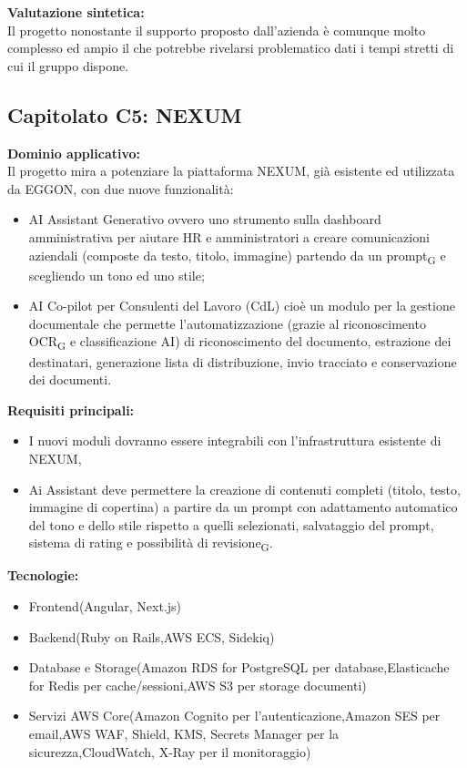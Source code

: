 \vspace{0.3cm}
\textbf{Valutazione sintetica:} \\
Il progetto nonostante il supporto proposto dall'azienda è comunque molto complesso ed ampio il che potrebbe rivelarsi problematico dati i 
tempi stretti di cui il gruppo dispone.

\vspace{0.5cm}

\vspace{0.5cm}

\subsection{Capitolato C5: {NEXUM} }

\textbf{Dominio applicativo:} \\
{Il progetto mira a potenziare la piattaforma NEXUM, già esistente ed utilizzata da EGGON, con due nuove funzionalità:}
\begin{itemize}
    \item AI Assistant Generativo ovvero uno strumento sulla dashboard amministrativa per aiutare HR e amministratori a creare comunicazioni aziendali (composte da testo, titolo, immagine) partendo da un prompt\textsubscript{G} e scegliendo un tono ed uno stile;
    \item AI Co-pilot per Consulenti del Lavoro (CdL) cioè un modulo per la gestione documentale che permette l’automatizzazione (grazie al riconoscimento OCR\textsubscript{G} e classificazione AI) di riconoscimento del documento, estrazione dei destinatari, generazione lista di distribuzione, invio tracciato e conservazione dei documenti.
\end{itemize}
\vspace{0.3cm}

\textbf{Requisiti principali:}
\begin{itemize}
	\item I nuovi moduli dovranno essere integrabili con l’infrastruttura esistente di NEXUM,
	\item Ai Assistant deve permettere la creazione di contenuti completi (titolo, testo, immagine di copertina) a partire da un prompt con adattamento automatico del tono e dello stile rispetto a quelli selezionati, salvataggio del prompt, sistema di rating e possibilità di revisione\textsubscript{G}.
\end{itemize}

\vspace{0.3cm}
\textbf{Tecnologie:}
\begin{itemize}
	\item {Frontend(Angular, Next.js)}
    \item {Backend(Ruby on Rails,AWS ECS, Sidekiq)}
    \item {Database e Storage(Amazon RDS for PostgreSQL per database,Elasticache for Redis per cache/sessioni,AWS S3 per storage documenti)}
    \item {Servizi AWS Core(Amazon Cognito per l’autenticazione,Amazon SES per email,AWS WAF, Shield, KMS, Secrets Manager per la sicurezza,CloudWatch, X-Ray per il monitoraggio)}
\end{itemize}

